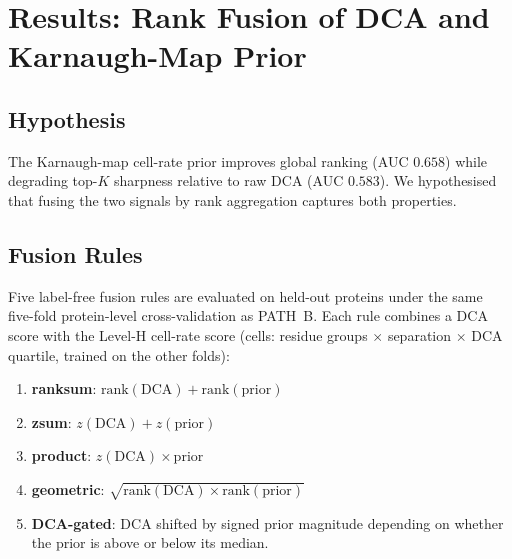 \section{Results: Rank Fusion of DCA and Karnaugh-Map Prior}
\label{sec:results-fusion}

\subsection{Hypothesis}
The Karnaugh-map cell-rate prior improves global ranking (AUC $0.658$) while
degrading top-$K$ sharpness relative to raw DCA (AUC $0.583$).  We
hypothesised that fusing the two signals by rank aggregation captures both
properties.

\subsection{Fusion Rules}
Five label-free fusion rules are evaluated on held-out proteins under the same
five-fold protein-level cross-validation as PATH~B.  Each rule combines a DCA
score with the Level-H cell-rate score (cells: residue groups $\times$
separation $\times$ DCA quartile, trained on the other folds):

\begin{enumerate}[nosep]
	\item \textbf{ranksum}: $\mathrm{rank}(\mathrm{DCA}) + \mathrm{rank}(\mathrm{prior})$
	\item \textbf{zsum}: $z(\mathrm{DCA}) + z(\mathrm{prior})$
	\item \textbf{product}: $z(\mathrm{DCA}) \times \mathrm{prior}$
	\item \textbf{geometric}: $\sqrt{\mathrm{rank}(\mathrm{DCA}) \times \mathrm{rank}(\mathrm{prior})}$
	\item \textbf{DCA-gated}: $\mathrm{DCA}$ shifted by signed prior magnitude
	      depending on whether the prior is above or below its median.
\end{enumerate}

